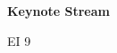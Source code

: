 \documentclass[a4paper]{article}
\begin{document}
\printGenericVSLHeader
\begin{center}
\begin{vsltext}{3cm}{3.5cm}

    \vspace{0.5cm}

    \textbf{Keynote Stream} 

    \vspace{1.5cm}

    EI 9


\end{vsltext}

\end{center}
\end{document}
